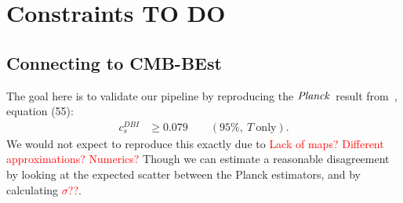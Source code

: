 %
\chapter{Constraints TO DO}\label{chapter:constraints}
\section{Connecting to CMB-BEst}
    The goal here is to validate our pipeline by reproducing the $\textit{Planck}$~result
    from~\cite{Planck_NG_2018}, equation (55):
    \begin{align}
        c_s^{DBI}&\ge0.079\qquad(95\%,~T~\text{only}).
    \end{align}
    We would not expect to reproduce this exactly due to
    \textcolor{red}{Lack of maps? Different approximations? Numerics?}
    Though we can estimate a reasonable disagreement by looking at
    the expected scatter between the Planck estimators, and by calculating
    \textcolor{red}{$\sigma$??}.

